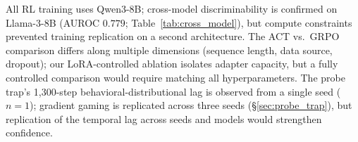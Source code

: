 All RL training uses Qwen3-8B; cross-model discriminability is confirmed on Llama-3-8B (AUROC $0.779$; Table~\ref{tab:cross_model}), but compute constraints prevented training replication on a second architecture.
The ACT vs.\ GRPO comparison differs along multiple dimensions (sequence length, data source, dropout); our LoRA-controlled ablation isolates adapter capacity, but a fully controlled comparison would require matching all hyperparameters.
The probe trap's 1{,}300-step behavioral-distributional lag is observed from a single seed ($n{=}1$); gradient gaming is replicated across three seeds (\S\ref{sec:probe_trap}), but replication of the temporal lag across seeds and models would strengthen confidence.

